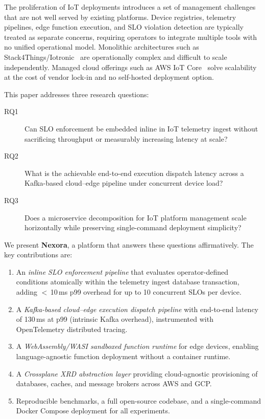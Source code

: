 \documentclass[twocolumn,smallextended]{svjour3}
\begin{document}
The proliferation of IoT deployments introduces a set of management challenges
that are not well served by existing platforms. Device registries, telemetry
pipelines, edge function execution, and SLO violation detection are typically
treated as separate concerns, requiring operators to integrate multiple tools
with no unified operational model. Monolithic architectures such as
Stack4Things/Iotronic~\cite{ardagna2015stack4things,longo2019iotronic} are
operationally complex and difficult to scale independently. Managed cloud
offerings such as AWS IoT Core~\cite{awsiot} solve scalability at the cost of
vendor lock-in and no self-hosted deployment option.

This paper addresses three research questions:

\begin{description}
  \item[RQ1] Can SLO enforcement be embedded inline in IoT telemetry ingest
    without sacrificing throughput or measurably increasing latency at scale?
  \item[RQ2] What is the achievable end-to-end execution dispatch latency
    across a Kafka-based cloud--edge pipeline under concurrent device load?
  \item[RQ3] Does a microservice decomposition for IoT platform management
    scale horizontally while preserving single-command deployment simplicity?
\end{description}

We present \textbf{Nexora}, a platform that answers these questions affirmatively.
The key contributions are:

\begin{enumerate}
  \item An \emph{inline SLO enforcement pipeline} that evaluates operator-defined
    conditions atomically within the telemetry ingest database transaction,
    adding $<$\,10\,ms p99 overhead for up to 10 concurrent SLOs per device.
  \item A \emph{Kafka-based cloud--edge execution dispatch pipeline} with
    end-to-end latency of 130\,ms at p99 (intrinsic Kafka overhead),
    instrumented with OpenTelemetry distributed tracing.
  \item A \emph{WebAssembly/WASI sandboxed function runtime} for edge devices,
    enabling language-agnostic function deployment without a container runtime.
  \item A \emph{Crossplane XRD abstraction layer} providing cloud-agnostic
    provisioning of databases, caches, and message brokers across AWS and GCP.
  \item Reproducible benchmarks, a full open-source codebase, and a
    single-command Docker Compose deployment for all experiments.
\end{enumerate}
\end{document}
